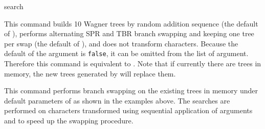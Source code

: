 \begin{command}{search}{}
\begin{arguments}
	\end{arguments}

        
    	\begin{poyexamples}
        	
            {This command builds 10 Wagner trees by random addition sequence (the default
            of ), performs alternating SPR and TBR branch swapping
            and keeping one tree per swap (the default of ), and does not
            transform characters. Because the default of the argument 
            is \texttt{false}, it can be omitted from the list of argument. Therefore this command
            is equivalent to . Note that if currently there are
            trees in memory, the new trees generated by  will replace
            them.}
	
	{This command performs branch swapping on the existing trees in memory
	under default parameters of  as shown in the examples
	above. The searches are performed on characters transformed using
	sequential application of  arguments
	 and 
	to speed up the swapping procedure.}
	
            \end{poyexamples}

	\begin{poyalso}
	\end{poyalso}

\end{command}

